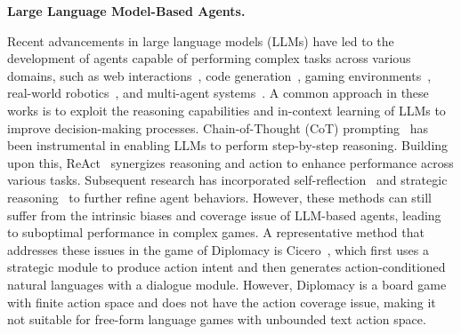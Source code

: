 \textbf{Large Language Model-Based Agents.}

Recent advancements in large language models (LLMs) have led to the development of agents capable of performing complex tasks across various domains, such as web interactions~\cite{nakano2021webgpt,yao2022webshop,deng2023mind2web}, code generation~\cite{chen2021evaluating,yang2024swe}, gaming environments~\cite{huang2022language,wang2023describe,wang2023voyager,ma2023large}, real-world robotics~\cite{ahn2022can,huang2022inner,vemprala2023chatgpt}, and multi-agent systems~\cite{park2023generative,li2023camel,chen2023agentverse}.
A common approach in these works is to exploit the reasoning capabilities and in-context learning of LLMs to improve decision-making processes.
Chain-of-Thought (CoT) prompting~\cite{wei2022chain} has been instrumental in enabling LLMs to perform step-by-step reasoning.
Building upon this, ReAct~\cite{yao2022react} synergizes reasoning and action to enhance performance across various tasks.
Subsequent research has incorporated self-reflection~\cite{shinn2023reflexion} and strategic reasoning~\cite{gandhi2023strategic} to further refine agent behaviors.
However, these methods can still suffer from the intrinsic biases and coverage issue of LLM-based agents, leading to suboptimal performance in complex games. A representative method that addresses these issues in the game of Diplomacy is Cicero~\cite{meta2022human}, which first uses a strategic module to produce action intent and then generates action-conditioned natural languages with a dialogue module. However, Diplomacy is a board game with finite action space and does not have the action coverage issue, making it not suitable for free-form language games with unbounded text action space.

